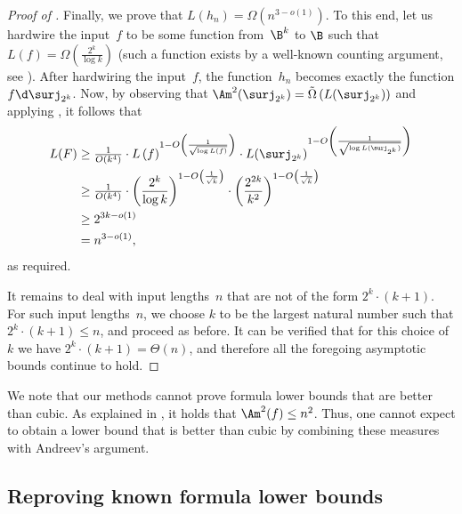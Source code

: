 \begin{proof}[Proof of ]
Finally, we prove that $L(h_{n})=\Omega(n^{3-o(1)})$. To this end,
let us hardwire the input~$f$ to be some function from~$\B^{k}$
to $\B$ such that $L(f)=\Omega(\frac{2^{k}}{\log k})$ (such a function
exists by a well-known counting argument, see \cite[Theorem 1.23]{JuknaBook}).
After hardwiring the input~$f$, the function~$h_{n}$ becomes exactly
the function $f\d\surj_{2^{k}}$. Now, by observing that $\Am^{2}(\surj_{2^{k}})=\tilde{\Omega}\left(L(\surj_{2^{k}})\right)$
and applying , it follows that 
\begin{align*}
L(F) & \ge\tfrac{1}{O(k^{4})}\cdot L\left(f\right)^{1-O\left(\frac{1}{\sqrt{\log L(f)}}\right)}\cdot L(\surj_{2^{k}})^{1-O\left(\frac{1}{\sqrt{\log L(\surj_{2^{k}})}}\right)}\\
 & \ge\tfrac{1}{O(k^{4})}\cdot\left(\frac{2^{k}}{\log k}\right)^{1-O\left(\frac{1}{\sqrt{k}}\right)}\cdot\left(\frac{2^{2k}}{k^{2}}\right)^{1-O\left(\frac{1}{\sqrt{k}}\right)}\\
 & \ge2^{3k-o(1)}\\
 & =n^{3-o(1)},
\end{align*}
as required.

It remains to deal with input lengths~$n$ that are not of the form
$2^{k}\cdot(k+1)$. For such input lengths~$n$, we choose $k$ to
be the largest natural number such that $2^{k}\cdot(k+1)\le n$, and
proceed as before. It can be verified that for this choice of~$k$
we have $2^{k}\cdot(k+1)=\Theta(n)$, and therefore all the
foregoing asymptotic bounds continue to hold. 
\end{proof}
\begin{remark}
We note that our methods cannot prove formula lower bounds that are
better than cubic. As explained in , 
it holds
that %
$\Am^2(f) \le n^{2}$.   %
Thus, one cannot expect
to obtain a lower bound that is better than cubic by combining these
measures with Andreev's argument. 
\end{remark}


\subsection{\label{subsec:known-results}Reproving known formula lower bounds}

